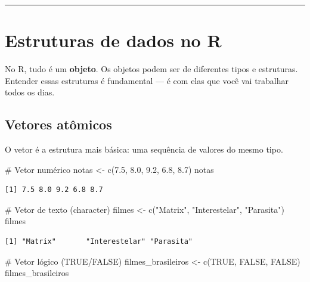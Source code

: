 \documentclass[
  letterpaper,
]{scrbook}
\newenvironment{Shaded}{\begin{snugshade}}{\end{snugshade}}
\newcommand{\CommentTok}[1]{\textcolor[rgb]{0.37,0.37,0.37}{#1}}
\newcommand{\ConstantTok}[1]{\textcolor[rgb]{0.56,0.35,0.01}{#1}}
\newcommand{\FloatTok}[1]{\textcolor[rgb]{0.68,0.00,0.00}{#1}}
\newcommand{\FunctionTok}[1]{\textcolor[rgb]{0.28,0.35,0.67}{#1}}
\newcommand{\NormalTok}[1]{\textcolor[rgb]{0.00,0.23,0.31}{#1}}
\newcommand{\OtherTok}[1]{\textcolor[rgb]{0.00,0.23,0.31}{#1}}
\newcommand{\StringTok}[1]{\textcolor[rgb]{0.13,0.47,0.30}{#1}}
\begin{document}
\begin{center}\rule{0.5\linewidth}{0.5pt}\end{center}

\section{Estruturas de dados no R}\label{estruturas-de-dados-no-r}

No R, tudo é um \textbf{objeto}. Os objetos podem ser de diferentes
tipos e estruturas. Entender essas estruturas é fundamental --- é com
elas que você vai trabalhar todos os dias.

\subsection{Vetores atômicos}\label{vetores-atuxf4micos}

O vetor é a estrutura mais básica: uma sequência de valores do mesmo
tipo.

\begin{Shaded}
\begin{Highlighting}[]
\CommentTok{\# Vetor numérico}
\NormalTok{notas }\OtherTok{\textless{}{-}} \FunctionTok{c}\NormalTok{(}\FloatTok{7.5}\NormalTok{, }\FloatTok{8.0}\NormalTok{, }\FloatTok{9.2}\NormalTok{, }\FloatTok{6.8}\NormalTok{, }\FloatTok{8.7}\NormalTok{)}
\NormalTok{notas}
\end{Highlighting}
\end{Shaded}

\begin{verbatim}
[1] 7.5 8.0 9.2 6.8 8.7
\end{verbatim}

\begin{Shaded}
\begin{Highlighting}[]
\CommentTok{\# Vetor de texto (character)}
\NormalTok{filmes }\OtherTok{\textless{}{-}} \FunctionTok{c}\NormalTok{(}\StringTok{"Matrix"}\NormalTok{, }\StringTok{"Interestelar"}\NormalTok{, }\StringTok{"Parasita"}\NormalTok{)}
\NormalTok{filmes}
\end{Highlighting}
\end{Shaded}

\begin{verbatim}
[1] "Matrix"       "Interestelar" "Parasita"    
\end{verbatim}

\begin{Shaded}
\begin{Highlighting}[]
\CommentTok{\# Vetor lógico (TRUE/FALSE)}
\NormalTok{filmes\_brasileiros }\OtherTok{\textless{}{-}} \FunctionTok{c}\NormalTok{(}\ConstantTok{TRUE}\NormalTok{, }\ConstantTok{FALSE}\NormalTok{, }\ConstantTok{FALSE}\NormalTok{)}
\NormalTok{filmes\_brasileiros}
\end{Highlighting}
\end{Shaded}
\end{document}
